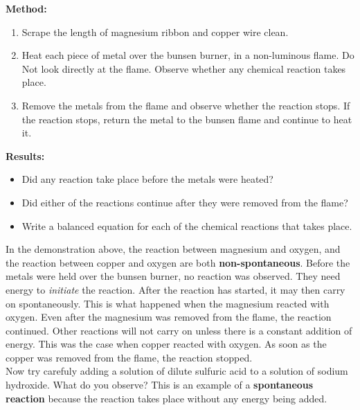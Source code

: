 {\textbf{Method:\\}

\begin{enumerate}
\item{Scrape the length of magnesium ribbon and copper wire clean.}
\item{Heat each piece of metal over the bunsen burner, in a non-luminous flame. Do Not look directly at the flame. Observe whether any chemical reaction takes place.}
\item{Remove the metals from the flame and observe whether the reaction stops. If the reaction stops, return the metal to the bunsen flame and continue to heat it.\\}
\end{enumerate}

\textbf{Results:\\}

\begin{itemize}
\item{Did any reaction take place before the metals were heated?}
\item{Did either of the reactions continue after they were removed from the flame?}
\item{Write a balanced equation for each of the chemical reactions that takes place.}
\end{itemize}
}

In the demonstration above, the reaction between magnesium and oxygen, and the reaction between copper and oxygen are both \textbf{non-spontaneous}. Before the metals were held over the bunsen burner, no reaction was observed.  They need energy to \textit{initiate} the reaction. After the reaction has started, it may then carry on spontaneously. This is what happened when the magnesium reacted with oxygen. Even after the magnesium was removed from the flame, the reaction continued. Other reactions will not carry on unless there is a constant addition of energy. This was the case when copper reacted with oxygen. As soon as the copper was removed from the flame, the reaction stopped.\\

Now try carefuly adding a solution of dilute sulfuric acid to a solution of sodium hydroxide. What do you observe? This is an example of a \textbf{spontaneous reaction} because the reaction takes place without any energy being added.



